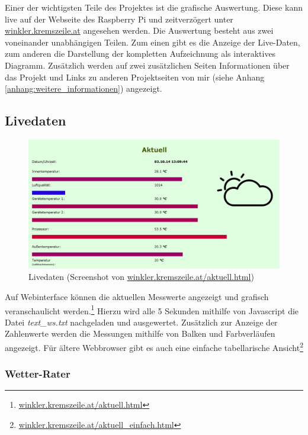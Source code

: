 Einer der wichtigsten Teile des Projektes ist die grafische Auswertung. Diese kann live auf der Webseite des Raspberry Pi und zeitverzögert unter \href{http://winkler.kremszeile.at}{winkler.kremszeile.at} angesehen werden. Die Auswertung besteht aus zwei voneinander unabhängigen Teilen. Zum einen gibt es die Anzeige der Live-Daten, zum anderen die Darstellung der kompletten Aufzeichnung als interaktives Diagramm. Zusätzlich werden auf zwei zusätzlichen Seiten Informationen über das Projekt und Links zu anderen Projektseiten von mir (siehe Anhang \ref{anhang:weitere_informationen}) angezeigt.

\subsection{Livedaten}
\label{subsec:Livedaten}

\begin{figure}[h]
  \centering
     \includegraphics[width=\textwidth]{figures/aktuell.png}
  \caption{Livedaten (Screenshot von \href{http://winkler.kremszeile.at/aktuell.html}{winkler.kremszeile.at/aktuell.html})}
  \label{fig:livedaten}
\end{figure}

Auf Webinterface können die aktuellen Messwerte angezeigt und grafisch veranschaulicht werden.\footnote{\href{http://winkler.kremszeile.at/aktuell.html}{winkler.kremszeile.at/aktuell.html}}
Hierzu wird alle 5 Sekunden mithilfe von \gls{Javascript} die Datei \emph{text\_ws.txt} nachgeladen und ausgewertet. Zusätzlich zur Anzeige der Zahlenwerte werden die Messungen mithilfe von Balken und Farbverläufen angezeigt. Für ältere Webbrowser gibt es auch eine einfache tabellarische Ansicht\footnote{\href{http://winkler.kremszeile.at/aktuell_einfach.html}{winkler.kremszeile.at/aktuell\_einfach.html}}

\subsubsection{Wetter-Rater}
\label{subsubsec:Wetterrater}

